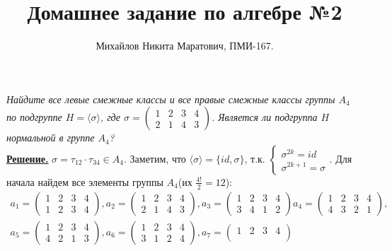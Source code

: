 \documentclass[14pt,a4paper]{scrartcl}
\title{
 Домашнее задание по алгебре №2\\
}
\author{
	Михайлов Никита Маратович, ПМИ-167.\\
}
\date{}
\begin{document}
\maketitle
\begin{spacing}{1}
	\begin{center}
	\end{center}
	\textit{Найдите все левые смежные классы и все правые смежные классы группы
		$A_4$ по подгруппе $H = \langle \sigma \rangle$, где $\sigma =
		\left(
		\begin{array}{cccc}
			1 & 2 & 3 & 4 \\
			2& 1 & 4 & 3 
		\end{array}
		\right)$. Является ли подгруппа $H$ нормальной в группе $A_4$?} \\
	\noindent \underline{\textbf{Решение.}} $\sigma = \tau_{12}\cdot\tau_{34} \in A_4$. Заметим, что $\langle \sigma \rangle = \{id, \sigma\}$, т.к. 
	$\begin{cases}
		\sigma^{2k} = id \\
		\sigma^{2k+1} = \sigma
	\end{cases}$. 
	Для начала найдем все элементы группы $A_4$(их $\frac{4!}{2} = 12$):
	\begin{gather*}
	a_1 = \begin{pmatrix}
	1 & 2 & 3 & 4 \\
	1 & 2 & 3 & 4
	\end{pmatrix},
	a_2 = \begin{pmatrix}
	1 & 2 & 3 & 4 \\
	2 & 1 & 4 & 3
	\end{pmatrix},
	a_3 = \begin{pmatrix}
	1 & 2 & 3 & 4 \\
	3 & 4 & 1 & 2
	\end{pmatrix}
	a_4 = \begin{pmatrix}
	1 & 2 & 3 & 4 \\
	4 & 3 & 2 & 1
	\end{pmatrix}, \\
	a_5 = \begin{pmatrix}
	1 & 2 & 3 & 4 \\
	4 & 2 & 1 & 3
	\end{pmatrix},
	a_6 = \begin{pmatrix}
	1 & 2 & 3 & 4 \\
	3 & 1 & 2 & 4
	\end{pmatrix},
	a_7 = \begin{pmatrix}
	1 & 2 & 3 & 4 \\

\end{pmatrix}
\end{gather*}
\end{spacing}
\end{document}
